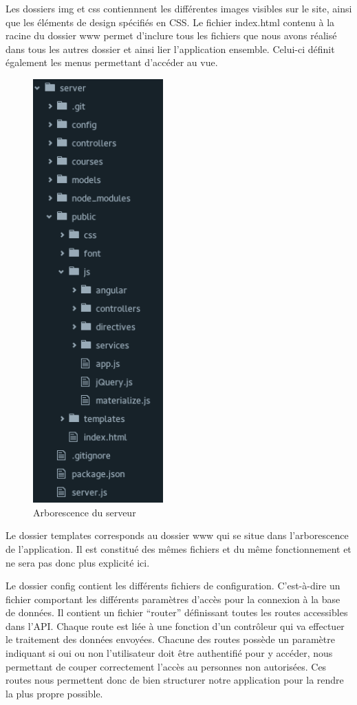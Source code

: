 \documentclass[pidr]{tnreport}
\begin{document}
Les dossiers img et css contiennnent les différentes images visibles sur le site, ainsi que les éléments de design spécifiés en CSS. Le fichier index.html contenu à la racine du dossier www permet d’inclure tous les fichiers que nous avons réalisé dans tous les autres dossier et ainsi lier l’application ensemble. Celui-ci définit également les menus permettant d’accéder au vue.
\newpage


\begin{figure}
  \centering
  \includegraphics[width=5cm]{figures/tree_server}
  \caption{Arborescence du serveur}
  \label{fig:tree-server}
\end{figure}
Le dossier templates corresponds au dossier www qui se situe dans l’arborescence de l’application. Il est constitué des mêmes fichiers et du même fonctionnement et ne sera pas donc plus explicité ici.

Le dossier config contient les différents fichiers de configuration. C’est-à-dire un fichier comportant les différents paramètres d’accès pour la connexion à la base de données. Il contient un fichier “router” définissant toutes les routes accessibles dans l’API. Chaque route est liée à une fonction d’un contrôleur qui va effectuer le traitement des données envoyées. Chacune des routes possède un paramètre indiquant si oui ou non l’utilisateur doit être authentifié pour y accéder, nous permettant de couper correctement l'accès au personnes non autorisées. Ces routes nous permettent donc de bien structurer notre application pour la rendre la plus propre possible.
\end{document}
